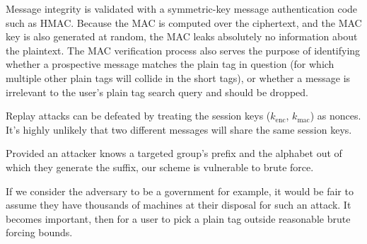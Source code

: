 Message integrity is validated with a symmetric-key message
authentication code such as HMAC. Because the MAC is computed over the
ciphertext, and the MAC key is also generated at random, the MAC leaks
absolutely no information about the plaintext. The MAC verification
process also serves the purpose of identifying whether a prospective
message matches the plain tag in question (for which multiple other
plain tags will collide in the short tags), or whether a message is
irrelevant to the user's plain tag search query and should be dropped.

Replay attacks can be defeated by treating the session keys
($k_{\mathrm{enc}}$, $k_{\mathrm{mac}}$) as nonces. It's highly unlikely
that two different messages will share the same session keys.


%
Provided an attacker knows a targeted group's prefix and the alphabet
out of which they generate the suffix, our scheme is vulnerable to brute
force.

If we consider the adversary to be a government for example, it would be fair to assume they have
thousands of machines at their disposal for such an attack. It becomes
important, then for a user to pick a plain tag outside reasonable brute
forcing bounds.


%


